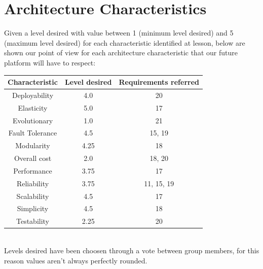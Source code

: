 \documentclass[a4paper,11pt]{report}
\begin{document}
	\section*{Architecture Characteristics}
	Given a level desired with value between 1 (minimum level desired) and 5 (maximum level desired) for each characteristic identified at lesson, below are shown our point of view for each architecture characteristic that our future platform will have to respect: 
	\begin{table}[hbt!]
		\centering
		\label{tab:my-table}
		
		\begin{tabular}{|c |c|c|}
			\hline
			\multicolumn{1}{|c|}{\textbf{Characteristic}} & \multicolumn{1}{c|}{\textbf{Level desired}}  & \multicolumn{1}{c|}{\textbf{Requirements referred}}\\ \hline
		Deployability	&    4.0                                        &  20                                                                                        \\ \hline
		Elasticity &  5.0                                          &  17                                                                                         \\ \hline
		Evolutionary & 1.0                                           &  21                                                                                         \\ \hline
		Fault Tolerance &  4.5                                           &   15, 19                                                                                      \\ \hline
		Modularity &  4.25                                           &  18                                                                                         \\ \hline
		Overall cost &  2.0   &  18, 20                                                                          \\ \hline
		Performance &  3.75                                           &  17                                                                                         \\ \hline
		Reliability &  3.75                                           &     11, 15, 19                                                                                     \\ \hline
		Scalability &  4.5                                           & 17                                                                                          \\ \hline
		Simplicity &   4.5                                          & 18                                                                                          \\ \hline
		Testability &  2.25                                           & 20                                                                                 \\ \hline
		\end{tabular}
	\end{table}
	\\Levels desired have been choosen through a vote between group members, for this reason values aren't always perfectly rounded.
\end{document}
